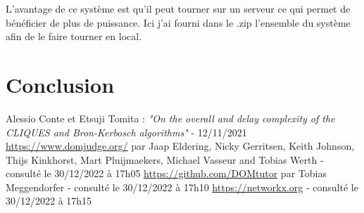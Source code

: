\documentclass[a4paper, 12pt]{article}
\begin{document}
L'avantage de ce système est qu'il peut tourner sur un serveur ce qui permet de bénéficier de plus de puissance. Ici j'ai fourni dans le .zip l'ensemble du système afin de le faire tourner en local.

\section{Conclusion}


\newpage
\begin{thebibliography}{unsrt}
 Alessio Conte et Etsuji Tomita :  \textit{"On the overall and delay complexity of the CLIQUES and Bron-Kerbosch algorithms"} -  12/11/2021
 \url{https://www.domjudge.org/} par Jaap Eldering, Nicky Gerritsen, Keith Johnson, Thijs Kinkhorst, Mart Pluijmaekers, Michael Vasseur and Tobias Werth - consulté le 30/12/2022 à 17h05
 \url{https://github.com/DOMtutor} par Tobias Meggendorfer - consulté le 30/12/2022 à 17h10
 \url{https://networkx.org} - consulté le 30/12/2022 à 17h15
\end{thebibliography}
\end{document}
